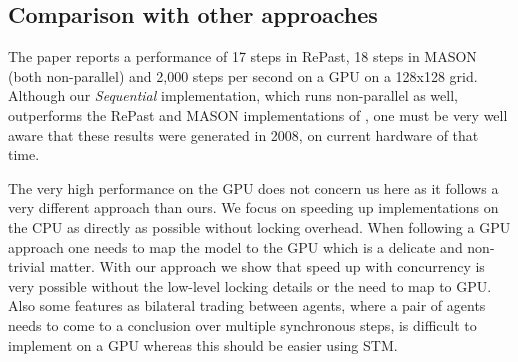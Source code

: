 %

\subsection{Comparison with other approaches}
The paper \cite{lysenko_framework_2008} reports a performance of 17 steps in RePast, 18 steps in MASON (both non-parallel) and 2,000 steps per second on a GPU on a 128x128 grid. Although our \textit{Sequential} implementation, which runs non-parallel as well, outperforms the RePast and MASON implementations of \cite{lysenko_framework_2008}, one must be very well aware that these results were generated in 2008, on current hardware of that time.


The very high performance on the GPU does not concern us here as it follows a very different approach than ours. We focus on speeding up implementations on the CPU as directly as possible without locking overhead. When following a GPU approach one needs to map the model to the GPU which is a delicate and non-trivial matter. With our approach we show that speed up with concurrency is very possible without the low-level locking details or the need to map to GPU. Also some features as bilateral trading between agents, where a pair of agents needs to come to a conclusion over multiple synchronous steps, is difficult to implement on a GPU whereas this should be easier using STM.

